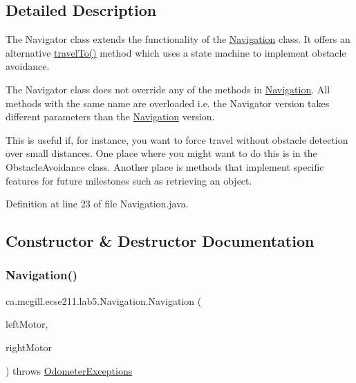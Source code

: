 \subsection{Detailed Description}
The Navigator class extends the functionality of the \hyperlink{classca_1_1mcgill_1_1ecse211_1_1lab5_1_1_navigation}{Navigation} class. It offers an alternative \hyperlink{classca_1_1mcgill_1_1ecse211_1_1lab5_1_1_navigation_a0f3288c38c7c28b495ae4d7e95d85f78}{travel\+To()} method which uses a state machine to implement obstacle avoidance.

The Navigator class does not override any of the methods in \hyperlink{classca_1_1mcgill_1_1ecse211_1_1lab5_1_1_navigation}{Navigation}. All methods with the same name are overloaded i.\+e. the Navigator version takes different parameters than the \hyperlink{classca_1_1mcgill_1_1ecse211_1_1lab5_1_1_navigation}{Navigation} version.

This is useful if, for instance, you want to force travel without obstacle detection over small distances. One place where you might want to do this is in the Obstacle\+Avoidance class. Another place is methods that implement specific features for future milestones such as retrieving an object. 

Definition at line 23 of file Navigation.\+java.



\subsection{Constructor \& Destructor Documentation}
\mbox{\label{classca_1_1mcgill_1_1ecse211_1_1lab5_1_1_navigation_a93b746f61226c3b14532c43d0c2f61dd}} 
\subsubsection{\texorpdfstring{Navigation()}{Navigation()}}
{\footnotesize\ttfamily ca.\+mcgill.\+ecse211.\+lab5.\+Navigation.\+Navigation (\begin{DoxyParamCaption}\item[{E\+V3\+Large\+Regulated\+Motor}]{left\+Motor,  }\item[{E\+V3\+Large\+Regulated\+Motor}]{right\+Motor }\end{DoxyParamCaption}) throws \hyperlink{classca_1_1mcgill_1_1ecse211_1_1odometer_1_1_odometer_exceptions}{Odometer\+Exceptions}}

